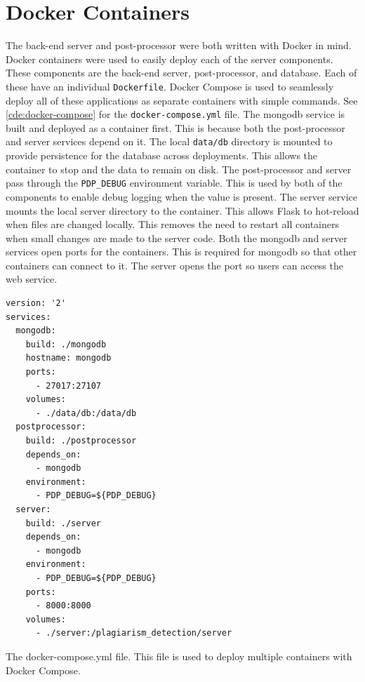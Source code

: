 \newpage

\section{Docker Containers}
The back-end server and post-processor were both written with Docker in mind. Docker containers were used to easily deploy each of the server components. These components are the back-end server, post-processor, and database. Each of these have an individual \texttt{Dockerfile}. Docker Compose is used to seamlessly deploy all of these applications as separate containers with simple commands. See \autoref{cde:docker-compose} for the \texttt{docker-compose.yml} file. The mongodb service is built and deployed as a container first. This is because both the post-processor and server services depend on it. The local \texttt{data/db} directory is mounted to provide persistence for the database across deployments. This allows the container to stop and the data to remain on disk. The post-processor and server pass through the \texttt{PDP\_DEBUG} environment variable. This is used by both of the components to enable debug logging when the value is present. The server service mounts the local server directory to the container. This allows Flask to hot-reload when files are changed locally. This removes the need to restart all containers when small changes are made to the server code. Both the mongodb and server services open ports for the containers. This is required for mongodb so that other containers can connect to it. The server opens the port so users can access the web service.

\begin{code}
\begin{verbatim}
version: '2'
services:
  mongodb:
    build: ./mongodb
    hostname: mongodb
    ports:
      - 27017:27107
    volumes:
      - ./data/db:/data/db
  postprocessor:
    build: ./postprocessor
    depends_on:
      - mongodb
    environment:
      - PDP_DEBUG=${PDP_DEBUG}
  server:
    build: ./server
    depends_on:
      - mongodb
    environment:
      - PDP_DEBUG=${PDP_DEBUG}
    ports:
      - 8000:8000
    volumes:
      - ./server:/plagiarism_detection/server
\end{verbatim}
\caption{The docker-compose.yml file. This file is used to deploy multiple containers with Docker Compose.}
\label{cde:docker-compose}
\end{code}

